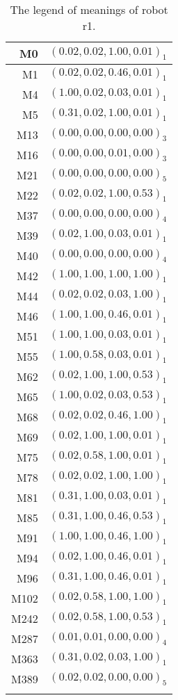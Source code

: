 \begin{table}[h]
\centering
{\footnotesize\begin{tabular}{rc}
\lsptoprule
M0 & $(0.02,0.02,1.00,0.01)_1$\\\hline
M1 & $(0.02,0.02,0.46,0.01)_1$\\\hline
M4 & $(1.00,0.02,0.03,0.01)_1$\\\hline
M5 & $(0.31,0.02,1.00,0.01)_1$\\\hline
M13 & $(0.00,0.00,0.00,0.00)_3$\\\hline
M16 & $(0.00,0.00,0.01,0.00)_3$\\\hline
M21 & $(0.00,0.00,0.00,0.00)_5$\\\hline
M22 & $(0.02,0.02,1.00,0.53)_1$\\\hline
M37 & $(0.00,0.00,0.00,0.00)_4$\\\hline
M39 & $(0.02,1.00,0.03,0.01)_1$\\\hline
M40 & $(0.00,0.00,0.00,0.00)_4$\\\hline
M42 & $(1.00,1.00,1.00,1.00)_1$\\\hline
M44 & $(0.02,0.02,0.03,1.00)_1$\\\hline
M46 & $(1.00,1.00,0.46,0.01)_1$\\\hline
M51 & $(1.00,1.00,0.03,0.01)_1$\\\hline
M55 & $(1.00,0.58,0.03,0.01)_1$\\\hline
M62 & $(0.02,1.00,1.00,0.53)_1$\\\hline
M65 & $(1.00,0.02,0.03,0.53)_1$\\\hline
M68 & $(0.02,0.02,0.46,1.00)_1$\\\hline
M69 & $(0.02,1.00,1.00,0.01)_1$\\\hline
M75 & $(0.02,0.58,1.00,0.01)_1$\\\hline
M78 & $(0.02,0.02,1.00,1.00)_1$\\\hline
M81 & $(0.31,1.00,0.03,0.01)_1$\\\hline
M85 & $(0.31,1.00,0.46,0.53)_1$\\\hline
M91 & $(1.00,1.00,0.46,1.00)_1$\\\hline
M94 & $(0.02,1.00,0.46,0.01)_1$\\\hline
M96 & $(0.31,1.00,0.46,0.01)_1$\\\hline
M102 & $(0.02,0.58,1.00,1.00)_1$\\\hline
M242 & $(0.02,0.58,1.00,0.53)_1$\\\hline
M287 & $(0.01,0.01,0.00,0.00)_4$\\\hline
M363 & $(0.31,0.02,0.03,1.00)_1$\\\hline
M389 & $(0.02,0.02,0.00,0.00)_5$\\
\lspbottomrule
\end{tabular}}
\caption{The legend of meanings of robot r1.}
\label{t:st:legend1a}
\end{table}


